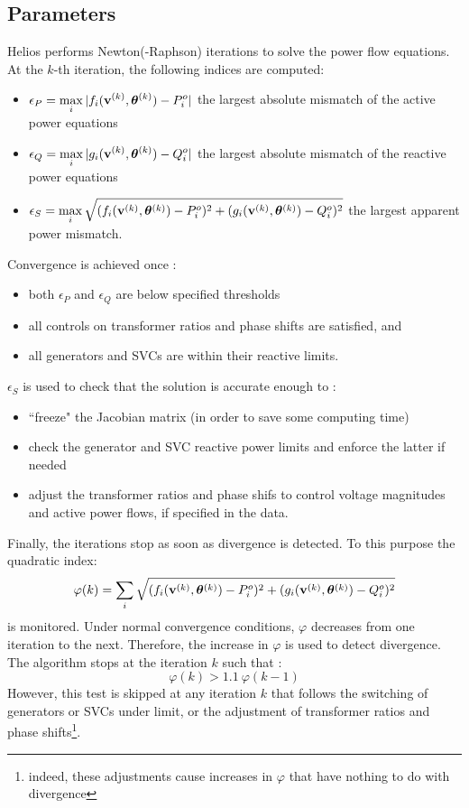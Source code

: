 \subsection{Parameters}

Helios performs Newton(-Raphson) iterations to solve the power flow equations. At the $k$-th iteration, the following indices are computed:
\begin{itemize}
\item[] $\displaystyle \epsilon_P = \max_i |f_i({\bf v}^{(k)}, {\bm \theta}^{(k)}) - P^o_i|$ the largest absolute mismatch of the active power equations
\item[] $\displaystyle \epsilon_Q = \max_i |g_i({\bf v}^{(k)}, {\bm \theta}^{(k)}) - Q^o_i|$ the largest absolute mismatch of the reactive power equations
\item[] $\displaystyle \epsilon_S = \max_i \sqrt{(f_i({\bf v}^{(k)}, {\bm \theta}^{(k)}) - P^o_i)^2 + 
    (g_i({\bf v}^{(k)}, {\bm \theta}^{(k)}) - Q^o_i)^2}$ the largest apparent power mismatch.
\end{itemize}
Convergence is achieved once :
\begin{itemize}
\item both $\epsilon_P$ and $\epsilon_Q$ are below specified thresholds
\item all controls on transformer ratios and phase shifts are satisfied, and
\item all generators and SVCs are within their reactive limits.
\end{itemize}

$\epsilon_S$ is used to check that the solution is accurate enough to :
\begin{itemize}
\item ``freeze" the Jacobian matrix (in order to save some computing time)
\item check the generator and SVC reactive power limits and enforce the latter if needed
\item adjust the transformer ratios and phase shifs to control voltage magnitudes and active power flows, if specified in the data.
\end{itemize}

Finally, the iterations stop as soon as divergence is detected. To this purpose the quadratic index:
\[  \varphi(k) = \sum_i \sqrt{(f_i({\bf v}^{(k)}, {\bm \theta}^{(k)}) - P^o_i)^2 + (g_i({\bf v}^{(k)}, {\bm \theta}^{(k)}) - Q^o_i)^2} \]
is monitored. Under normal convergence conditions, $\varphi$ decreases from one iteration to the next. Therefore, the increase in $\varphi$ is used to detect divergence. The algorithm stops at the iteration $k$ such that :
\[ \varphi (k) > 1.1 \: \varphi(k-1) \]
However, this test is skipped at any iteration $k$ that follows the switching of generators or SVCs under limit, or the adjustment of transformer ratios and phase shifts\footnote{indeed, these adjustments cause increases in $\varphi$ that have nothing to do with divergence}.

